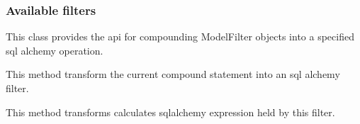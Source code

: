 \documentclass[letterpaper,10pt,english]{sphinxmanual}
\begin{document}
\subsubsection{Available filters}
\label{features/mvc:available-filters}

\begin{fulllineitems}
\label{features/mvc:fantastico.mvc.models.model_filter_compound.ModelFilterCompound}
This class provides the api for compounding ModelFilter objects into a specified sql alchemy operation.

\begin{fulllineitems}
\label{features/mvc:fantastico.mvc.models.model_filter_compound.ModelFilterCompound.build}
This method transform the current compound statement into an sql alchemy filter.

\end{fulllineitems}


\begin{fulllineitems}
\label{features/mvc:fantastico.mvc.models.model_filter_compound.ModelFilterCompound.get_expression}
This method transforms calculates sqlalchemy expression held by this filter.

\end{fulllineitems}


\end{fulllineitems}

\end{document}
